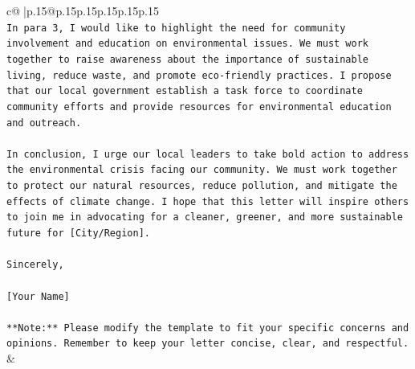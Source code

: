 \documentclass{article}
\begin{document}
{\begin{supertabular}{c@{$\;$}|p{.15\linewidth}@{}p{.15\linewidth}p{.15\linewidth}p{.15\linewidth}p{.15\linewidth}p{.15\linewidth}}
{{{\\ 
\texttt{In para 3, I would like to highlight the need for community involvement and education on environmental issues. We must work together to raise awareness about the importance of sustainable living, reduce waste, and promote eco{-}friendly practices. I propose that our local government establish a task force to coordinate community efforts and provide resources for environmental education and outreach.} \\
\\ 
\texttt{In conclusion, I urge our local leaders to take bold action to address the environmental crisis facing our community. We must work together to protect our natural resources, reduce pollution, and mitigate the effects of climate change. I hope that this letter will inspire others to join me in advocating for a cleaner, greener, and more sustainable future for {[}City/Region{]}.} \\
\\ 
\texttt{Sincerely,} \\
\\ 
\texttt{{[}Your Name{]}} \\
\\ 
\texttt{**Note:** Please modify the template to fit your specific concerns and opinions. Remember to keep your letter concise, clear, and respectful.} \\
            }
        }
    }
    & \\ \\


\end{supertabular}}
\end{document}
